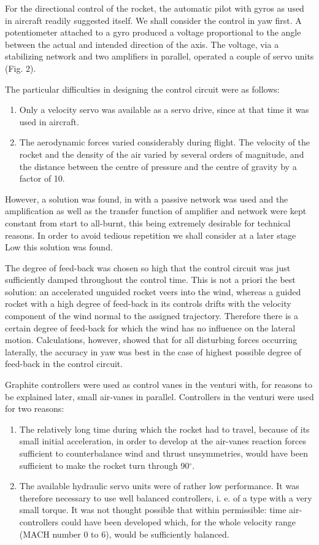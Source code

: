 \documentclass[12pt, a4paper]{article}
\begin{document}
For the directional control of the rocket, the automatic pilot with gyros as used in aircraft readily suggested itself. We shall consider the control in yaw first. A potentiometer attached to a gyro produced a voltage proportional to the angle between the actual and intended direction of the axis. The voltage, via a stabilizing network and two amplifiers in parallel, operated a couple of servo units (Fig. 2).

The particular difficulties in designing the control circuit were as follows:

\begin{enumerate}
  \item Only a velocity servo was available as a servo drive, since at that time it was used in aircraft.
  \item The aerodynamic forces varied considerably during flight. The velocity of the rocket and the density of the air varied by several orders of magnitude, and the distance between the centre of pressure and the centre of gravity by a factor of 10.
\end{enumerate}

However, a solution was found, in with a passive network was used and the amplification as well as the transfer function of amplifier and network were kept constant from start to all-burnt, this being extremely desirable for technical reasons. In order to avoid tedious repetition we shall consider at a later stage Low this solution was found.

The degree of feed-back was chosen so high that the control circuit was just sufficiently damped throughout the control time. This is not a priori the best solution: an accelerated unguided rocket veers into the wind, whereas a guided rocket with a high degree of feed-back in its controls drifts with the velocity component of the wind normal to the assigned trajectory. Therefore there is a certain degree of feed-back for which the wind has no influence on the lateral motion. Calculations, however, showed that for all disturbing forces occurring laterally, the accuracy in yaw was best in the case of highest possible degree of feed-back in the control circuit.

Graphite controllers were used as control vanes in the venturi with, for reasons to be explained later, small air-vanes in parallel. Controllers in the venturi were used for two reasons:

\begin{enumerate}
  \item The relatively long time during which the rocket had to travel, because of its small initial acceleration, in order to develop at the air-vanes reaction forces sufficient to counterbalance wind and thrust unsymmetries, would have been sufficient to make the rocket turn through 90$^\circ$.
  \item The available hydraulic servo units were of rather low performance. It was therefore necessary to use well balanced controllers, i. e. of a type with a very small torque. It was not thought possible that within permissible: time air-controllers could have been developed which, for the whole velocity range (MACH number 0 to 6), would be sufficiently balanced.
\end{enumerate}
\end{document}
